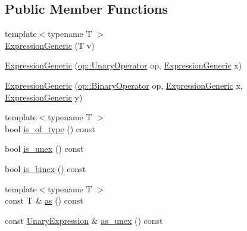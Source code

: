 \subsection*{Public Member Functions}
\begin{DoxyCompactItemize}
\item 
{\footnotesize template$<$typename T $>$ }\\\mbox{\hyperlink{structxd_1_1parser_1_1expr_1_1_expression_generic_a0c3157d80ae800a6613bc1062c6ca442}{Expression\+Generic}} (T v)
\item 
\mbox{\hyperlink{structxd_1_1parser_1_1expr_1_1_expression_generic_ae51e310802e7adb5cfadc38d1414ed7b}{Expression\+Generic}} (\mbox{\hyperlink{namespacexd_1_1parser_1_1expr_1_1op_ac61563bdf571a06b442d1fe819ff75bd}{op\+::\+Unary\+Operator}} op, \mbox{\hyperlink{structxd_1_1parser_1_1expr_1_1_expression_generic}{Expression\+Generic}} x)
\item 
\mbox{\hyperlink{structxd_1_1parser_1_1expr_1_1_expression_generic_a7ebc687019b453f807bd542d5218ae31}{Expression\+Generic}} (\mbox{\hyperlink{namespacexd_1_1parser_1_1expr_1_1op_a5d85beecf0ae4a43576fdeacb264886a}{op\+::\+Binary\+Operator}} op, \mbox{\hyperlink{structxd_1_1parser_1_1expr_1_1_expression_generic}{Expression\+Generic}} x, \mbox{\hyperlink{structxd_1_1parser_1_1expr_1_1_expression_generic}{Expression\+Generic}} y)
\item 
{\footnotesize template$<$typename T $>$ }\\bool \mbox{\hyperlink{structxd_1_1parser_1_1expr_1_1_expression_generic_a0ea90206de4b9849fbfb27cf7fc8fb4d}{is\+\_\+of\+\_\+type}} () const
\item 
bool \mbox{\hyperlink{structxd_1_1parser_1_1expr_1_1_expression_generic_a8e93204715ea39c2fc81e4f4b5fd2f25}{is\+\_\+unex}} () const
\item 
bool \mbox{\hyperlink{structxd_1_1parser_1_1expr_1_1_expression_generic_ace7fe3eb335cfab0f9ca22dca6a3184a}{is\+\_\+binex}} () const
\item 
{\footnotesize template$<$typename T $>$ }\\const T \& \mbox{\hyperlink{structxd_1_1parser_1_1expr_1_1_expression_generic_a84ba793388ecd438f862673e80287e6d}{as}} () const
\item 
const \mbox{\hyperlink{structxd_1_1parser_1_1expr_1_1_expression_generic_a8cca2ad1a4cf5a6e05d9bcc1c440c184}{Unary\+Expression}} \& \mbox{\hyperlink{structxd_1_1parser_1_1expr_1_1_expression_generic_ae0307162ebb617834a8e0c7f66e4c435}{as\+\_\+unex}} () const
\item 

\end{DoxyCompactItemize}
